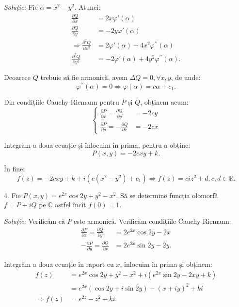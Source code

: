 \documentclass[11pt,a4paper]{article}
\newcommand\RR{\mathbb{R}}
\newcommand\CC{\mathbb{C}}
\theoremstyle{dotless}
\theoremstyle{dotlessdr}
\begin{document}
\emph{Soluție:} Fie $ \alpha = x^2 - y^2 $. Atunci:
\begin{align*}
  \frac{\partial Q}{\partial x} &= 2x\varphi'(\alpha) \\
  \frac{\partial Q}{\partial y} &= -2y\varphi'(\alpha) \\
  \Rightarrow \frac{\partial^2 Q}{\partial x^2} &= 2\varphi'(\alpha) + %
                                                  4x^2 \varphi^{\prime\prime}(\alpha) \\
  \frac{\partial^2 Q}{\partial y^2} &= -2\varphi'(\alpha) + 4y^2\varphi^{\prime\prime}(\alpha).
\end{align*}

Deoarece $ Q $ trebuie să fie armonică, avem $ \Delta Q = 0, \forall x, y $, de unde:
\[
  \varphi^{\prime\prime}(\alpha) = 0 \Rightarrow \varphi(\alpha) = c\alpha + c_1.
\]

Din condițiile Cauchy-Riemann pentru $ P $ și $ Q $, obținem acum:
\[
  \begin{cases}
    \frac{\partial P}{\partial x} = \frac{\partial Q}{\partial y} &= -2cy \\
    \frac{\partial P}{\partial y} = -\frac{\partial Q}{\partial x} &= -2cx
  \end{cases}
\]

Integrăm a doua ecuație și înlocuim în prima, pentru a obține:
\[
  P(x, y) = -2cxy + k.
\]

În fine:
\[
  f(z) = -2cxy + k + i(c(x^2 - y^2) + c_1) \Rightarrow f(z) = ciz^2 + d, c, d \in \RR.
\]

\vspace{1cm}

4. Fie $ P(x, y) = e^{2x} \cos 2y + y^2 - x^2 $. Să se determine funcția
olomorfă $ f = P + iQ $ pe $ \CC $ astfel încît $ f(0) = 1 $.

\emph{Soluție:} Verificăm că $ P $ este armonică. Verificăm condițiile
Cauchy-Riemann:
\begin{align*}
  \frac{\partial P}{\partial x} = \frac{\partial Q}{\partial y} &= 2e^{2x} \cos 2y - 2x \\
  -\frac{\partial P}{\partial y} = \frac{\partial Q}{\partial x} &= 2e^{2x} \sin 2y - 2y.
\end{align*}

Integrăm a doua ecuație în raport cu $ x $, înlocuim în prima și obținem:
\begin{align*}
  f(z) &= e^{2x} \cos 2y + y^2 - x^2 + i(e^{2x}\sin 2y - 2xy + k) \\
       &= e^{2x}(\cos 2y + i\sin 2y) - (x + iy)^2 + ki \\
  \Rightarrow f(z) &= e^{2z} - z^2 + ki.
\end{align*}
\end{document}
